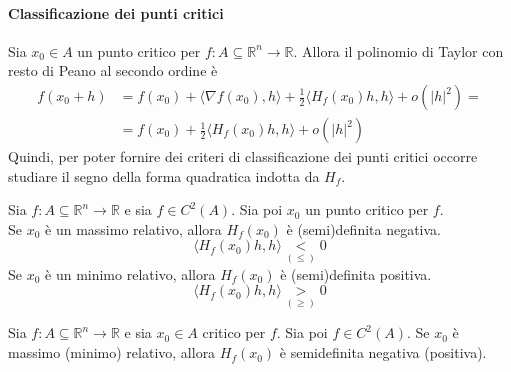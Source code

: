 \paragraph{Classificazione dei punti critici} Sia $x_0 \in A$ un punto critico per $f:A \subseteq \mathbb{R}^n\to \mathbb{R}$. Allora il polinomio di Taylor con resto di Peano al secondo ordine è
\begin{equation*}
    \begin{aligned}
        f(x_0+h)&=f(x_0)+ \langle \nabla f(x_0), h\rangle+ \frac{1}{2}\langle H_f(x_0)h,h \rangle +o(|h|^2)=\\ 
        &= f(x_0)+ \frac{1}{2}\langle H_f(x_0)h,h \rangle + o(|h|^2)
    \end{aligned}
\end{equation*} 
Quindi, per poter fornire dei criteri di classificazione dei punti critici occorre studiare il segno della forma quadratica indotta da $H_f$.
\begin{proposition}
    Sia $f:A \subseteq \mathbb{R}^n \to \mathbb{R}$ e sia $f \in C^2(A)$. Sia poi $x_0$ un punto critico per $f$.\\
    Se $x_0$ è un massimo relativo, allora $H_f(x_0)$ è (semi)definita negativa.
    \begin{equation*}
        \langle H_f(x_0)h, h \rangle \underset{(\leq)}{<} 0
    \end{equation*}
    Se $x_0$ è un minimo relativo, allora $H_f(x_0)$ è (semi)definita positiva.
    \begin{equation*}
        \langle H_f(x_0)h, h \rangle \underset{(\geq)}{>} 0
    \end{equation*}
\end{proposition}
\begin{theorem}  \label{Teo: Condizione necessaria del secondo ordine}
Sia $f: A \subseteq \mathbb{R}^n \to \mathbb{R}$ e sia $x_0 \in A$ critico per $f$. Sia poi $f \in C^2(A)$. Se $x_0$ è massimo (minimo) relativo, allora $H_f(x_0)$ è semidefinita negativa (positiva).
\end{theorem}
